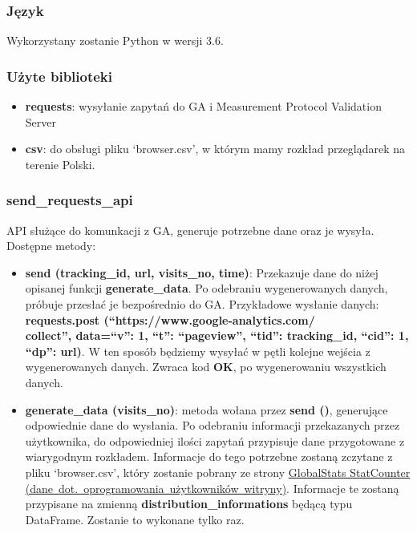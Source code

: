 \documentclass{article}
\begin{document}
\subsubsection{Język}

Wykorzystany zostanie Python w wersji 3.6.

\subsubsection{Użyte biblioteki}

\begin{itemize}
\item \textbf{requests}: wysyłanie zapytań do GA i Measurement Protocol Validation Server
\item \textbf{csv}: do obsługi pliku `browser.csv', w którym mamy rozkład przeglądarek na terenie Polski.
\end{itemize}

\subsubsection{send\_requests\_api}
API służące do komunkacji z GA, generuje potrzebne dane oraz je wysyła.
Dostępne metody:
\begin{itemize}
\item \textbf{send (tracking\_id, url, visits\_no, time)}: Przekazuje dane do niżej opisanej funkcji \textbf{generate\_data}. Po odebraniu wygenerowanych danych, próbuje przesłać je bezpośrednio do GA\@. Przykładowe wysłanie danych: \textbf{requests.post (``https://www.google-analytics.com/\\collect'', data={``v'':  1, ``t'': ``pageview'', ``tid'': tracking\_id, ``cid'': 1, ``dp'': url})}. W ten sposób będziemy wysyłać w pętli kolejne wejścia z wygenerowanych danych. Zwraca kod \textbf{OK}, po wygenerowaniu wszystkich danych.

\item \textbf{generate\_data (visits\_no)}: metoda wołana przez \textbf{send ()}, generujące odpowiednie dane do wysłania. Po odebraniu informacji przekazanych przez użytkownika, do odpowiedniej ilości zapytań przypisuje dane przygotowane z wiarygodnym rozkładem. Informacje do tego potrzebne zostaną zczytane z pliku `browser.csv', który zostanie pobrany ze strony \href{http://gs.statcounter.com/browser-version-market-share/all/poland#monthly-201703-201803-bar}{GlobalStats StatCounter (dane\ dot.\ oprogramowania\ użytkowników\ witryny)}. Informacje te zostaną przypisane na zmienną \textbf{distribution\_informations} będącą typu DataFrame. Zostanie to wykonane tylko raz.
\end{itemize}
\end{document}
